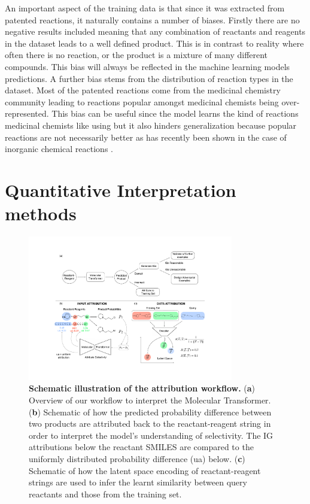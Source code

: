 An important aspect of the training data is that since it was extracted from patented reactions, it naturally contains a number of biases. Firstly there are no negative results included meaning that any combination of reactants and reagents in the dataset leads to a well defined product. This is in contrast to reality where often there is no reaction, or the product is a mixture of many different compounds. This bias will always be reflected in the machine learning models predictions. A further bias stems from the distribution of reaction types in the dataset. Most of the patented reactions come from the medicinal chemistry community leading to reactions popular amongst medicinal chemists being over-represented. This bias can be useful since the model learns the kind of reactions medicinal chemists like using \cite{Bjerrun2020} but it also hinders generalization because popular reactions are not necessarily better as has recently been shown in the case of inorganic chemical reactions \cite{Jia2019}.

\section{Quantitative Interpretation methods}

\begin{figure}[ht!]
    \centering
    \includegraphics[width=0.8\textwidth]{Chapters/Transformer/Figs/workflow.pdf}
    \caption{\label{fig:workflow} \textbf{Schematic illustration of the attribution workflow.} (\textbf{a}) Overview of our workflow to interpret the Molecular Transformer. (\textbf{b}) Schematic of how the predicted probability difference between two products are attributed back to the reactant-reagent string in order to interpret the model's understanding of selectivity. The IG attributions below the reactant SMILES are compared to the uniformly distributed probability difference (ua) below. (\textbf{c}) Schematic of how the latent space encoding of reactant-reagent strings are used to infer the learnt similarity between query reactants and those from the training set.}
\end{figure}

